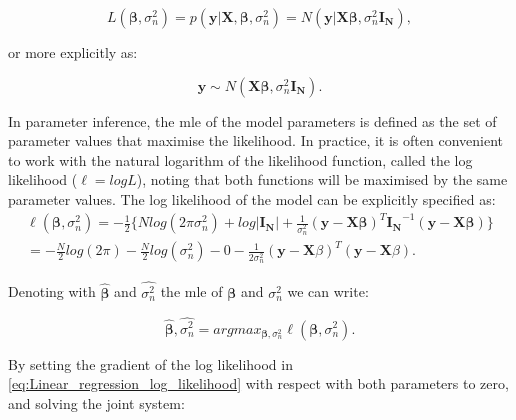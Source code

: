 \begin{equation} \label{eq:Linear_regression_likelihood}
 L(\boldsymbol{\beta}, \sigma_n^2) = p(\mathbf{y}| \mathbf{X}, \boldsymbol{\beta}, \sigma_n^2) = N(\mathbf{y} | \mathbf{X}\boldsymbol{\beta}, \sigma_n^2 \mathbf{I_N}), 
\end{equation}

or more explicitly as:

\begin{equation} \label{eq:Linear_regression_MVN_form}
\mathbf{y} \sim N(\mathbf{X}\boldsymbol{\beta}, \sigma_n^2 \mathbf{I_N}). 
\end{equation}

In parameter inference, the \gls{mle} of the model parameters is defined as the set of parameter values that maximise the likelihood.
In practice, it is often convenient to work with the natural logarithm of the likelihood function, called the log likelihood ($\ell = logL$), noting that both functions will be maximised by the same parameter values.
The log likelihood of the model can be explicitly specified as:\\

\begin{equation} \label{eq:Linear_regression_log_likelihood}
\begin{split}
 \ell(\boldsymbol{\beta}, \sigma_n^2) = -\frac{1}{2} \bigg\{Nlog(2\pi\sigma_n^2) + log|\mathbf{I_N}|+ \frac{1}{\sigma_n^2}(\mathbf{y}-\mathbf{X}\boldsymbol{\beta})^T\mathbf{I_N}^{-1}(\mathbf{y}-\mathbf{X}\boldsymbol{\beta}) \bigg\} \\
= -\frac{N}{2}log(2\pi) - \frac{N}{2}log(\sigma_n^2)- 0 - \frac{1}{2\sigma_n^2}(\mathbf{y}-\mathbf{X}\beta)^T(\mathbf{y}-\mathbf{X}\beta). 
\end{split}
\end{equation}

Denoting with $\hat{\boldsymbol{\beta}}$ and $\hat{\sigma_n^2}$ the \gls{mle} of $\boldsymbol{\beta}$ and $\sigma_n^2$ we can write:

\begin{equation} \label{eq:Linear_regression_MLEs}
\hat{\boldsymbol{\beta}},\hat{\sigma_n^2} = argmax_{\boldsymbol{\beta},\sigma_n^2}\ell(\boldsymbol{\beta}, \sigma_n^2). 
\end{equation} 

By setting the gradient of the log likelihood in \eqref{eq:Linear_regression_log_likelihood} with respect with both parameters to zero, and solving the joint system:

